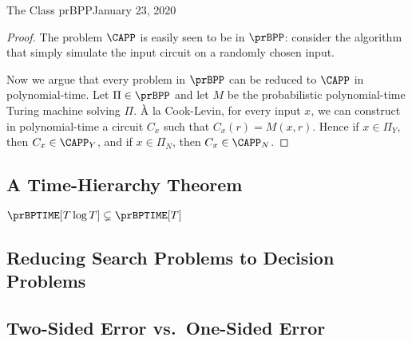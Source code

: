 \begin{lecture}{1}{The Class prBPP}{January 23, 2020}
\begin{proof}
  The problem $\CAPP$ is easily seen to be in $\prBPP$: consider the algorithm
  that simply simulate the input circuit on a randomly chosen input.

  Now we argue that every problem in $\prBPP$ can be reduced to $\CAPP$ in
  polynomial-time. Let $\Pi \in \prBPP$ and let $M$ be the probabilistic
  polynomial-time Turing machine solving $\Pi$. {\`A} la Cook-Levin, for every
  input $x$, we can construct in polynomial-time a circuit $C_x$ such that
  $C_x(r) = M(x, r)$. Hence if $x \in \Pi_Y$, then $C_x \in \CAPP_Y$, and if $x
  \in \Pi_N$, then $C_x \in \CAPP_N$.
\end{proof}

\subsection{A Time-Hierarchy Theorem}

\begin{theorem}
  $\prBPTIME[T \log{T}] \subsetneq \prBPTIME[T]$
\end{theorem}


\subsection{Reducing Search Problems to Decision Problems}

\subsection{Two-Sided Error vs.\ One-Sided Error}

\end{lecture}
